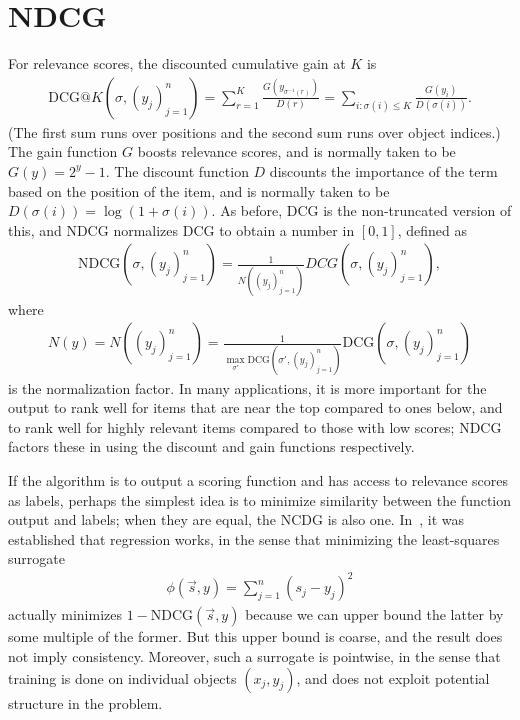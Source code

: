 \section{NDCG}
\label{sec:ndcg}
For relevance scores, the discounted cumulative gain at $K$ is 
\begin{align*}
  \text{DCG}@K(\sigma, (y_j)_{j=1}^n)
  = \sum_{r=1}^K \frac{G(y_{\sigma^{-1}(r)})}{D(r)}
  = \sum_{i: \sigma(i) \leq K} \frac{G(y_i)}{D(\sigma(i))}.
\end{align*}
(The first sum runs over positions and the second sum runs over
object indices.) The gain function $G$ boosts relevance scores, and is
normally taken to be $G(y) = 2^y - 1$. The discount function $D$ discounts
the importance of the term based on the position of the item, and is
normally taken to be $D(\sigma(i)) = \log(1 + \sigma(i))$. As before, DCG
is the non-truncated version of this, and NDCG normalizes DCG to obtain
a number in $[0,1]$, defined as
\begin{align*}
  \text{NDCG}(\sigma, (y_j)_{j=1}^n)
  = \frac{1}{N((y_j)_{j=1}^n)} DCG(\sigma, (y_j)_{j=1}^n),
\end{align*}
where
\begin{align*}
  N(y) = N((y_j)_{j=1}^n)
  = \frac{1}{\max_{\sigma'} \text{DCG}(\sigma', (y_j)_{j=1}^n)} \text{DCG}(\sigma, (y_j)_{j=1}^n)
\end{align*}
is the normalization factor. 
In many applications, it is more important for the output to rank well for
items that are near the top compared to ones below, and to rank well for
highly relevant items compared to those with low scores; NDCG factors
these in using the discount and gain functions respectively.

If the algorithm is to output a scoring function and has access to relevance
scores as labels, perhaps the simplest idea is to minimize similarity between
the function output and labels; when they are equal, the NCDG is also one.
In~\cite{bayes-optimal-subset-ranking}, it was
established that regression works, in the sense that minimizing the least-squares
surrogate
\begin{align*}
  \phi(\vec{s}, y) = \sum_{j=1}^n {(s_j - y_j)}^2
\end{align*}
actually minimizes $1 - \text{NDCG}(\vec{s}, y)$ because we can upper bound
the latter by some multiple of the former. But this upper bound is coarse, and
the result does not imply consistency. 
Moreover, such a surrogate is pointwise, in the sense
that training is done on individual objects $(x_j, y_j)$, and does not
exploit potential structure in the problem.

